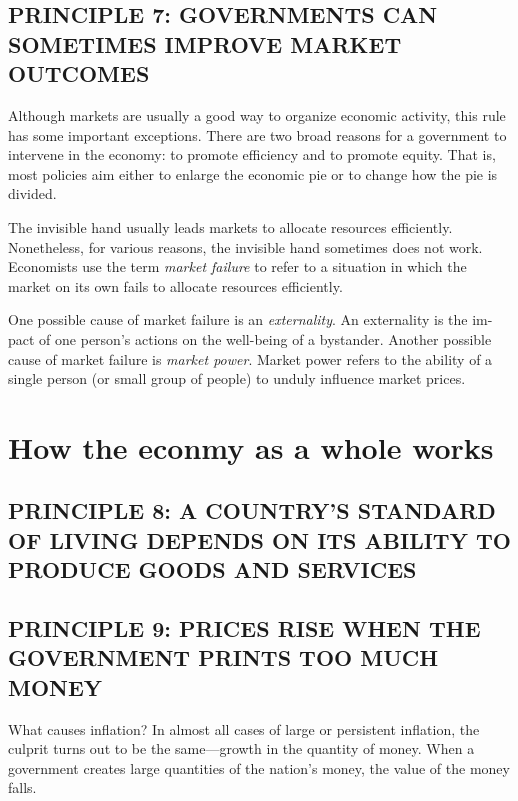\subsection*{PRINCIPLE 7: GOVERNMENTS CAN SOMETIMES IMPROVE MARKET OUTCOMES}

Although markets are usually a good way to organize economic activity, this rule has some important exceptions.
There are two broad reasons for a government to intervene in the economy: to promote efficiency and to promote equity.
That is, most policies aim either to enlarge the economic pie or to change how the pie is divided.



The invisible hand usually leads markets to allocate resources efficiently.
Nonetheless, for various reasons, the invisible hand sometimes does not work.
Economists use the term \emph{market failure} to refer to a situation in which the market on its own fails to allocate resources efficiently.



One possible cause of market failure is an \emph{externality}.
An externality is the im- pact of one person’s actions on the well-being of a bystander.
Another possible cause of market failure is \emph{market power}.
Market power refers to the ability of a single person (or small group of people) to unduly influence market prices.


\section{How the econmy as a whole works}

\subsection*{PRINCIPLE 8: A COUNTRY’S STANDARD OF LIVING DEPENDS ON ITS ABILITY TO PRODUCE GOODS AND SERVICES}

\subsection*{PRINCIPLE 9: PRICES RISE WHEN THE GOVERNMENT PRINTS TOO MUCH MONEY}

What causes inflation? In almost all cases of large or persistent inflation, the culprit turns out to be the same—growth in the quantity of money.
When a government creates large quantities of the nation’s money, the value of the money falls.



